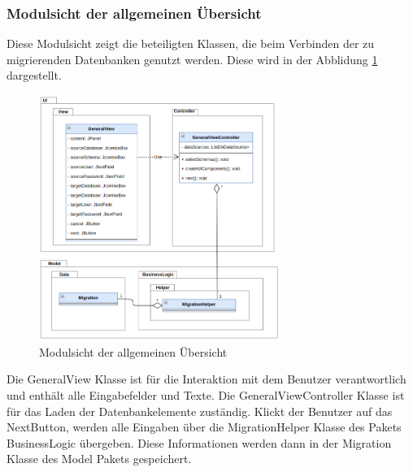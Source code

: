 \subsubsection{Modulsicht der allgemeinen Übersicht}
Diese Modulsicht zeigt die beteiligten Klassen, die beim Verbinden der zu migrierenden Datenbanken genutzt werden. Diese wird in der Abblidung \ref{img:modulsicht-general} dargestellt. 
\begin{figure}[H]
	\centering
	\includegraphics[width=0.7\textwidth]{images/sichten/modulsicht-general}
	\caption{Modulsicht der allgemeinen Übersicht}
	\label{img:modulsicht-general}
\end{figure}
Die GeneralView Klasse ist für die Interaktion mit dem Benutzer verantwortlich und enthält alle Eingabefelder und Texte. Die GeneralViewController Klasse ist für das Laden der Datenbankelemente zuständig. Klickt der Benutzer auf das \glq Next\grqq Button, werden alle Eingaben über die MigrationHelper Klasse des Pakets BusinessLogic übergeben. Diese Informationen werden dann in der Migration Klasse des Model Pakets gespeichert.


